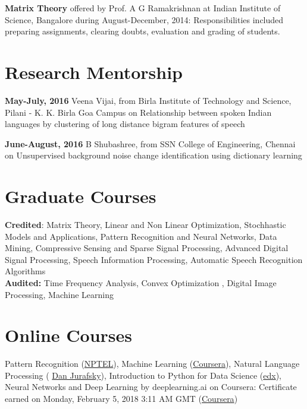 \documentclass[line]{resume}
\begin{document}
{\begin{resume}
		\textbf{Matrix Theory}  offered  by Prof. A G Ramakrishnan at  Indian Institute of Science, Bangalore during 
		August-December, 2014: Responsibilities included   preparing assignments, clearing doubts, evaluation and grading of students.
		\vspace{1mm}
			\vspace{-1.5mm}
			\section{\mysidestyle Research Mentorship}
			\vspace{1mm}
		\noindent	\textbf{ May-July, 2016}  Veena Vijai, from Birla Institute of Technology and Science, Pilani - K. K. Birla Goa Campus  on Relationship between spoken Indian languages by clustering of long distance bigram features of speech	
				\vspace{-3mm}
				
			\textbf{ June-August, 2016} B Shubashree, from SSN College of Engineering, Chennai on Unsupervised background noise change identification using dictionary learning
			\vspace{-1.5mm}
			
			\vspace{-2.5mm}
			\section{\mysidestyle Graduate Courses} 
			\vspace{2.5mm}
		\textbf{Credited}:	Matrix Theory,
			Linear and Non Linear Optimization, Stochhastic Models and Applications,		
			Pattern Recognition and Neural Networks, Data Mining, Compressive Sensing and Sparse Signal Processing, 	Advanced Digital Signal Processing, Speech Information Processing, Automatic Speech Recognition Algorithms\\
			\textbf{Audited: } Time Frequency Analysis, Convex Optimization , Digital Image Processing, Machine Learning
			
						\section{\mysidestyle Online Courses} 
						Pattern Recognition (\href{http://nptel.ac.in/courses/117108048/#}{NPTEL}), Machine Learning (\href{https://www.coursera.org/learn/machine-learning/home/welcome}{Coursera}), Natural Language Processing ( \href{https://www.youtube.com/playlist?list=PL6397E4B26D00A269}{Dan Jurafsky}), Introduction to Python for Data Science (\href{https://courses.edx.org/courses/course-v1:Microsoft+DAT208x+2T2017/course/}{edx}),  Neural Networks and Deep Learning by deeplearning.ai on Coursera: Certificate earned on Monday, February 5, 2018 3:11 AM GMT (\href{https://www.coursera.org/account/accomplishments/records/QSWQJRUQ47AX}{Coursera})
						

\end{resume}}
\end{document}
